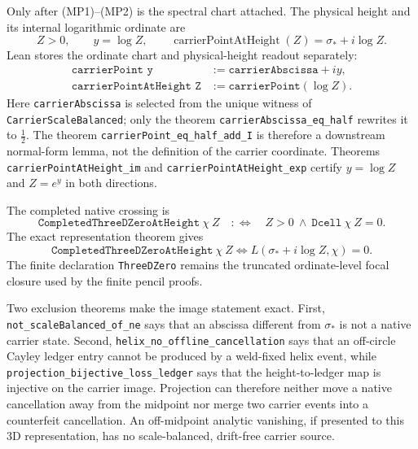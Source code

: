 \documentclass[11pt]{article}
\theoremstyle{definition}
\begin{document}
Only after (MP1)--(MP2) is the spectral chart attached.  The physical height
and its internal logarithmic ordinate are
\[
 Z>0,\qquad y=\log Z,\qquad
 \operatorname{carrierPointAtHeight}(Z)=\sigma_*+i\log Z.
\]
Lean stores the ordinate chart and physical-height readout separately:
\[
\begin{aligned}
 \texttt{carrierPoint y}&:=\texttt{carrierAbscissa}+iy,\\
 \texttt{carrierPointAtHeight Z}&:=\texttt{carrierPoint}(\log Z).
\end{aligned}
\]
Here \texttt{carrierAbscissa} is selected from the unique witness of
\texttt{CarrierScaleBalanced}; only the theorem
\texttt{carrierAbscissa\_eq\_half} rewrites it to \(\tfrac12\).  The theorem
\texttt{carrierPoint\_eq\_half\_add\_I} is therefore a downstream normal-form
lemma, not the definition of the carrier coordinate.  Theorems
\texttt{carrierPointAtHeight\_im} and
\texttt{carrierPointAtHeight\_exp} certify $y=\log Z$ and
$Z=e^y$ in both directions.

The completed native crossing is
\[
\texttt{CompletedThreeDZeroAtHeight}\ \chi\ Z
 \quad:\Longleftrightarrow\quad
 Z>0\ \wedge\ \texttt{Dcell}\ \chi\ Z=0.
\]
The exact representation theorem gives
\[
 \texttt{CompletedThreeDZeroAtHeight}\ \chi\ Z
 \Longleftrightarrow
 L(\sigma_*+i\log Z,\chi)=0.
\]
The finite declaration \texttt{ThreeDZero} remains the truncated
ordinate-level focal closure used by the finite pencil proofs.

Two exclusion theorems make the image statement exact.  First,
\texttt{not\_scaleBalanced\_of\_ne} says that an abscissa different from
\(\sigma_*\) is not a native carrier state.  Second,
\texttt{helix\_no\_offline\_cancellation} says that an off-circle Cayley
ledger entry cannot be produced by a weld-fixed helix event, while
\texttt{projection\_bijective\_loss\_ledger} says that the height-to-ledger
map is injective on the carrier image.  Projection can therefore neither
move a native cancellation away from the midpoint nor merge two carrier
events into a counterfeit cancellation.  An off-midpoint analytic
vanishing, if presented to this 3D representation, has no scale-balanced,
drift-free carrier source.
\end{document}
